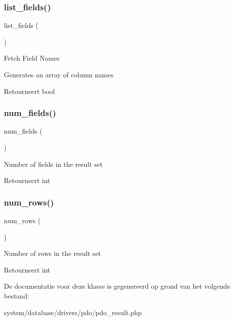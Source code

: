 \subsubsection{\texorpdfstring{list\_fields()}{list\_fields()}}
{\footnotesize\ttfamily list\+\_\+fields (\begin{DoxyParamCaption}{ }\end{DoxyParamCaption})}

Fetch Field Names

Generates an array of column names

\begin{DoxyReturn}{Retourneert}
bool 
\end{DoxyReturn}
\mbox{\label{class_c_i___d_b__pdo__result_af831bf363e4d7d661a717a4932af449d}} 
\subsubsection{\texorpdfstring{num\_fields()}{num\_fields()}}
{\footnotesize\ttfamily num\+\_\+fields (\begin{DoxyParamCaption}{ }\end{DoxyParamCaption})}

Number of fields in the result set

\begin{DoxyReturn}{Retourneert}
int 
\end{DoxyReturn}
\mbox{\label{class_c_i___d_b__pdo__result_a218657c303ee499b97710ab0cd2f5d6e}} 
\subsubsection{\texorpdfstring{num\_rows()}{num\_rows()}}
{\footnotesize\ttfamily num\+\_\+rows (\begin{DoxyParamCaption}{ }\end{DoxyParamCaption})}

Number of rows in the result set

\begin{DoxyReturn}{Retourneert}
int 
\end{DoxyReturn}


De documentatie voor deze klasse is gegenereerd op grond van het volgende bestand\+:\begin{DoxyCompactItemize}
\item 
system/database/drivers/pdo/pdo\+\_\+result.\+php\end{DoxyCompactItemize}

